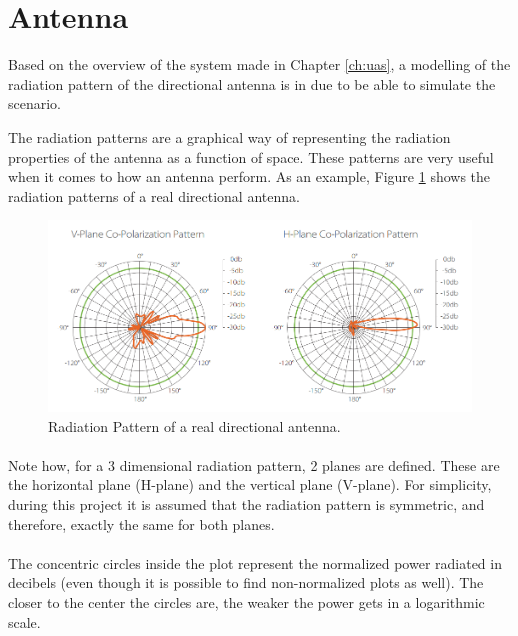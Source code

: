 \section{Antenna}\label{sec:antenna}

Based on the overview of the system made in Chapter \ref{ch:uas}, a modelling of the radiation pattern of the directional antenna is in due to be able to simulate the scenario.

The radiation patterns are a graphical way of representing the radiation properties of the antenna as a function of space. These patterns are very useful when it comes to how an antenna perform. As an example, Figure \ref{fig:radpattern} shows the radiation patterns of a real directional antenna.

\begin{figure}[H]
	\centerline{
	\includegraphics[scale=0.5]{figures/radpattern.png}}
	\caption{Radiation Pattern of a real directional antenna.}
	\label{fig:radpattern}
\end{figure}

\paragraph{}Note how, for a 3 dimensional radiation pattern, 2 planes are defined. These are the horizontal plane (H-plane) and the vertical plane (V-plane). For simplicity, during this project it is assumed that the radiation pattern is symmetric, and therefore, exactly the same for both planes.

\paragraph{}The concentric circles inside the plot represent the normalized power radiated in decibels (even though it is possible to find non-normalized plots as well). The closer to the center the circles are, the weaker the power gets in a logarithmic scale. 

